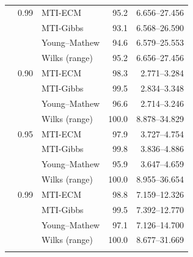 \begin{longtable}{@{}rrlrr@{}}
\addlinespace[0.3em]
500 & 0.99 & MTI-ECM & 95.2 & 6.656--27.456 \\
 &  & MTI-Gibbs & 93.1 & 6.568--26.590 \\
 &  & Young--Mathew & 94.6 & 6.579--25.553 \\
 &  & Wilks (range) & 95.2 & 6.656--27.456 \\
\addlinespace[0.3em]
1000 & 0.90 & MTI-ECM & 98.3 & 2.771--3.284 \\
 &  & MTI-Gibbs & 99.5 & 2.834--3.348 \\
 &  & Young--Mathew & 96.6 & 2.714--3.246 \\
 &  & Wilks (range) & 100.0 & 8.878--34.829 \\
\addlinespace[0.3em]
1000 & 0.95 & MTI-ECM & 97.9 & 3.727--4.754 \\
 &  & MTI-Gibbs & 99.8 & 3.836--4.886 \\
 &  & Young--Mathew & 95.9 & 3.647--4.659 \\
 &  & Wilks (range) & 100.0 & 8.955--36.654 \\
\addlinespace[0.3em]
1000 & 0.99 & MTI-ECM & 98.8 & 7.159--12.326 \\
 &  & MTI-Gibbs & 99.5 & 7.392--12.770 \\
 &  & Young--Mathew & 97.1 & 7.126--14.700 \\
 &  & Wilks (range) & 100.0 & 8.677--31.669 \\
\addlinespace[0.3em]
\end{longtable}
\clearpage
